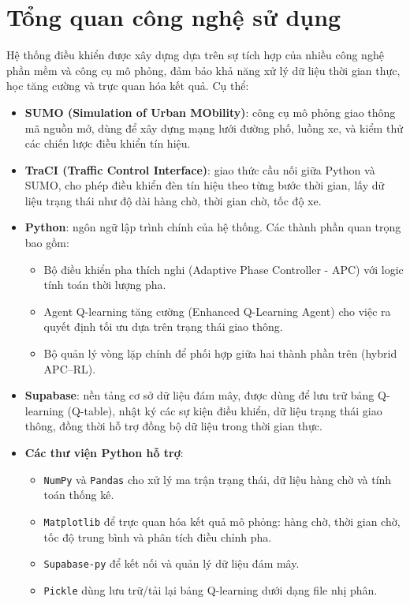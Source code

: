 \section{Tổng quan công nghệ sử dụng} 
Hệ thống điều khiển được xây dựng dựa trên sự tích hợp của nhiều công nghệ phần mềm và công cụ mô phỏng, đảm bảo khả năng xử lý dữ liệu thời gian thực, học tăng cường và trực quan hóa kết quả. Cụ thể: 
\begin{itemize} 
  \item \textbf{SUMO (Simulation of Urban MObility)}: công cụ mô phỏng giao thông mã nguồn mở, dùng để xây dựng mạng lưới đường phố, luồng xe, và kiểm thử các chiến lược điều khiển tín hiệu. 
   \item \textbf{TraCI (Traffic Control Interface)}: giao thức cầu nối giữa Python và SUMO, cho phép điều khiển đèn tín hiệu theo từng bước thời gian, lấy dữ liệu trạng thái như độ dài hàng chờ, thời gian chờ, tốc độ xe.
    \item \textbf{Python}: ngôn ngữ lập trình chính của hệ thống. Các thành phần quan trọng bao gồm: 
    \begin{itemize} 
      \item Bộ điều khiển pha thích nghi (Adaptive Phase Controller - APC) với logic tính toán thời lượng pha. 
      \item Agent Q-learning tăng cường (Enhanced Q-Learning Agent) cho việc ra quyết định tối ưu dựa trên trạng thái giao thông.
      \item Bộ quản lý vòng lặp chính để phối hợp giữa hai thành phần trên (hybrid APC–RL).
    \end{itemize} 
    \item \textbf{Supabase}: nền tảng cơ sở dữ liệu đám mây, được dùng để lưu trữ bảng Q-learning (Q-table), nhật ký các sự kiện điều khiển, dữ liệu trạng thái giao thông, đồng thời hỗ trợ đồng bộ dữ liệu trong thời gian thực.
    \item \textbf{Các thư viện Python hỗ trợ}:
    \begin{itemize} 
      \item \texttt{NumPy} và \texttt{Pandas} cho xử lý ma trận trạng thái, dữ liệu hàng chờ và tính toán thống kê. 
       \item \texttt{Matplotlib} để trực quan hóa kết quả mô phỏng: hàng chờ, thời gian chờ, tốc độ trung bình và phân tích điều chỉnh pha. 
       \item \texttt{Supabase-py} để kết nối và quản lý dữ liệu đám mây.
       \item \texttt{Pickle} dùng lưu trữ/tải lại bảng Q-learning dưới dạng file nhị phân. \end{itemize} 
    \end{itemize}
